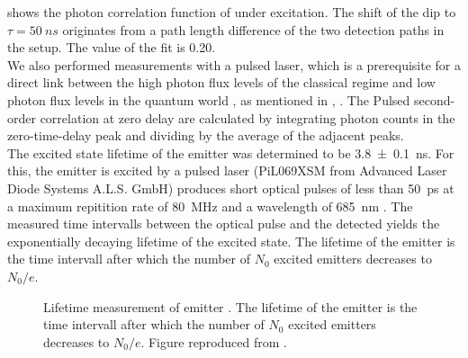 		 shows the photon correlation function of \emhtwo under \cw excitation. 
		The shift of the dip to $\tau=\SI{50}{ns}$ originates from a path length difference of the two detection paths in the \HBT setup.
		The \gtz value of the fit is \num{0.20}.
		\\
		We also performed measurements with a pulsed laser, which is a prerequisite for a direct link between the high photon flux levels of the classical regime and low photon flux levels in the quantum world \cite{Vaigu2017}, as mentioned in , \cite{SiquteProject}.
		The 
		Pulsed second-order correlation at zero delay \gtz are calculated by integrating photon counts in the zero-time-delay peak and dividing by the average of the adjacent peaks.
		\\
		The excited state lifetime of the emitter was determined to be \SI[separate-uncertainty]{3.8\pm0.1}{ns}.
		For this, the emitter is excited by a pulsed laser (PiL069XSM from Advanced Laser Diode Systems A.L.S. GmbH) produces short optical pulses of less than \SI{50}{\ps} at a maximum repitition rate of \SI{80}{\mega\hertz} and a wavelength of \SI{685}{\nm} \cite{Vaigu2017}. 
		The measured time intervalls between the optical pulse and the detected \fl yields the exponentially decaying lifetime of the excited state.
		The lifetime of the emitter is the time intervall after which the number of $N_0$ excited emitters decreases to $N_0/e$.
		\\
		
		\begin{figure}[htp]
			\centering
			\caption{Lifetime measurement of emitter \emhtwo. The lifetime of the emitter is the time intervall after which the number of $N_0$ excited emitters decreases to $N_0/e$. Figure reproduced from \cite{Vaigu2017}.}
			\label{fig::<fig>}
		\end{figure}

